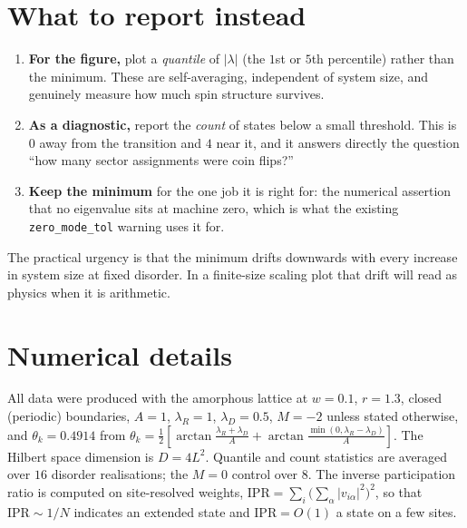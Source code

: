\documentclass[11pt,a4paper]{article}
\begin{document}
\section{What to report instead}

\begin{enumerate}
  \item \textbf{For the figure,} plot a \emph{quantile} of $|\lambda|$ (the
        $1$st or $5$th percentile) rather than the minimum. These are
        self-averaging, independent of system size, and genuinely measure how
        much spin structure survives.
  \item \textbf{As a diagnostic,} report the \emph{count} of states below a
        small threshold. This is $0$ away from the transition and $4$ near it,
        and it answers directly the question ``how many sector assignments
        were coin flips?''
  \item \textbf{Keep the minimum} for the one job it is right for: the
        numerical assertion that no eigenvalue sits at machine zero, which is
        what the existing \texttt{zero\_mode\_tol} warning uses it for.
\end{enumerate}

\noindent
The practical urgency is that the minimum drifts downwards with every increase
in system size at fixed disorder. In a finite-size scaling plot that drift will
read as physics when it is arithmetic.

\appendix
\section{Numerical details}

All data were produced with the amorphous lattice at $w=0.1$, $r=1.3$, closed
(periodic) boundaries, $A=1$, $\lambda_R=1$, $\lambda_D=0.5$, $M=-2$ unless
stated otherwise, and $\theta_k = 0.4914$ from
$\theta_k = \tfrac12[\arctan\frac{\lambda_R+\lambda_D}{A}
+ \arctan\frac{\min(0,\lambda_R-\lambda_D)}{A}]$.
The Hilbert space dimension is $D = 4L^2$. Quantile and count statistics are
averaged over $16$ disorder realisations; the $M=0$ control over $8$. The
inverse participation ratio is computed on site-resolved weights,
$\mathrm{IPR} = \sum_i \bigl(\sum_{\alpha}|v_{i\alpha}|^2\bigr)^2$, so that
$\mathrm{IPR}\sim1/N$ indicates an extended state and $\mathrm{IPR}=O(1)$ a
state on a few sites.
\end{document}
